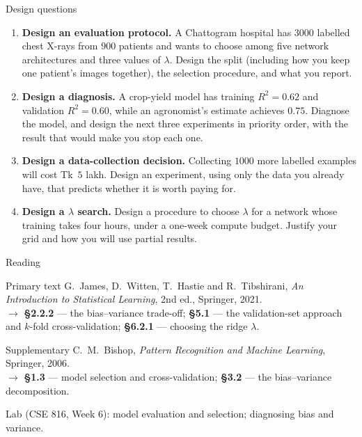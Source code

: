 \documentclass[aspectratio=169,10pt]{beamer}
\begin{document}
\begin{frame}{Design questions}
  \footnotesize
  \begin{enumerate}
    \item \textbf{Design an evaluation protocol.} A Chattogram hospital has $3000$ labelled
          chest X-rays from $900$ patients and wants to choose among five network
          architectures and three values of $\lambda$. Design the split (including how you
          keep one patient's images together), the selection procedure, and what you report.
          \hfill{}
    \item \textbf{Design a diagnosis.} A crop-yield model has training $R^2=0.62$ and
          validation $R^2=0.60$, while an agronomist's estimate achieves $0.75$. Diagnose
          the model, and design the next three experiments in priority order, with the
          result that would make you stop each one. \hfill{}
    \item \textbf{Design a data-collection decision.} Collecting $1000$ more labelled
          examples will cost Tk~$5$ lakh. Design an experiment, using only the data you
          already have, that predicts whether it is worth paying for. \hfill{}
    \item \textbf{Design a $\lambda$ search.} Design a procedure to choose $\lambda$ for a
          network whose training takes four hours, under a one-week compute budget. Justify
          your grid and how you will use partial results. \hfill{}
  \end{enumerate}
\end{frame}

\begin{frame}{Reading}
  \begin{block}{Primary text}
    G.~James, D.~Witten, T.~Hastie and R.~Tibshirani,
    \emph{An Introduction to Statistical Learning}, 2nd ed., Springer, 2021.\\[2pt]
    \hfill{\small$\rightarrow$ \textbf{\S2.2.2} --- the bias--variance trade-off;
    \textbf{\S5.1} --- the validation-set approach and $k$-fold cross-validation;
    \textbf{\S6.2.1} --- choosing the ridge $\lambda$.}
  \end{block}
  \begin{block}{Supplementary}
    C.~M.~Bishop, \emph{Pattern Recognition and Machine Learning}, Springer, 2006.\\[2pt]
    \hfill{\small$\rightarrow$ \textbf{\S1.3} --- model selection and cross-validation;
    \textbf{\S3.2} --- the bias--variance decomposition.}
  \end{block}
  \vspace{1mm}
  \begin{center}
    \small\color{cugray}
    Lab (CSE 816, Week 6): model evaluation and selection; diagnosing bias and variance.
  \end{center}
\end{frame}
\end{document}
